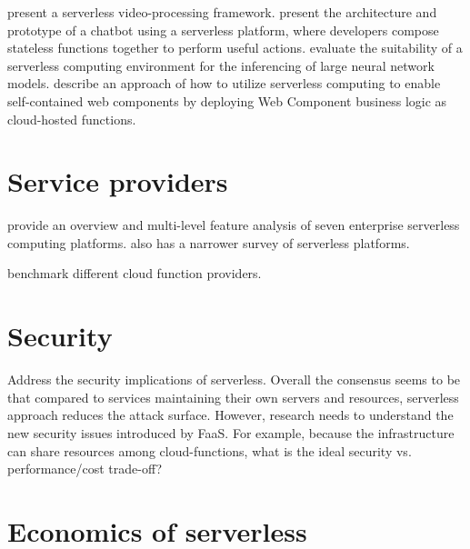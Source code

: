 \documentclass[utf8,english]{gradu3}
\begin{document}
\textcite{fouladi2017encoding} present a serverless video-processing framework. \textcite{yan16chatbot} present the architecture and prototype of a chatbot using a serverless platform, where developers compose stateless functions together to perform useful actions. \textcite{ishakian17neural} evaluate the suitability of a serverless computing environment for the inferencing of large neural network models. \textcite{ast17webcomponent} describe an approach of how to utilize serverless computing to enable self-contained web components by deploying Web Component business logic as cloud-hosted functions.

\section{Service providers} \label{sec:providers}

\textcite{lynn2017preliminary} provide an overview and multi-level feature analysis of seven enterprise serverless computing platforms. \textcite{baldini17currentTrends} also has a narrower survey of serverless platforms.

\textcite{malawski18benchmark} benchmark different cloud function providers.

\section{Security} \label{sec:security}

Address the security implications of serverless. Overall the consensus seems to be that compared to services maintaining their own servers and resources, serverless approach reduces the attack surface. However, research needs to understand the new security issues introduced by FaaS. For example, because the infrastructure can share resources among cloud-functions, what is the ideal security vs. performance/cost trade-off? \parencite{van2017spec}

\section{Economics of serverless} \label{sec:economics}
\end{document}
